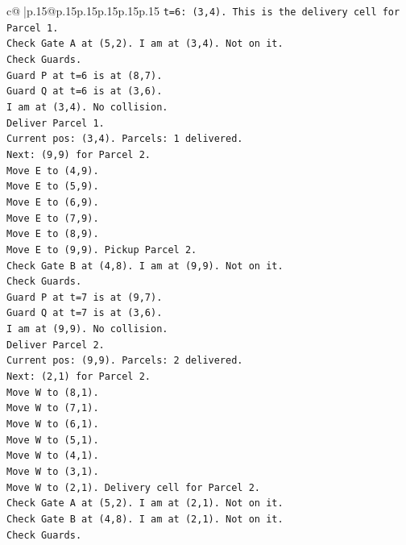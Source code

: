 \documentclass{article}
\begin{document}
{\begin{supertabular}{c@{$\;$}|p{.15\linewidth}@{}p{.15\linewidth}p{.15\linewidth}p{.15\linewidth}p{.15\linewidth}p{.15\linewidth}}
{{{\texttt{t=6: (3,4). This is the delivery cell for Parcel 1.} \\
\texttt{Check Gate A at (5,2). I am at (3,4). Not on it.} \\
\texttt{Check Guards.} \\
\texttt{Guard P at t=6 is at (8,7).} \\
\texttt{Guard Q at t=6 is at (3,6).} \\
\texttt{I am at (3,4). No collision.} \\
\texttt{Deliver Parcel 1.} \\
\texttt{Current pos: (3,4). Parcels: 1 delivered.} \\
\texttt{Next: (9,9) for Parcel 2.} \\
\texttt{Move E to (4,9).} \\
\texttt{Move E to (5,9).} \\
\texttt{Move E to (6,9).} \\
\texttt{Move E to (7,9).} \\
\texttt{Move E to (8,9).} \\
\texttt{Move E to (9,9). Pickup Parcel 2.} \\
\texttt{Check Gate B at (4,8). I am at (9,9). Not on it.} \\
\texttt{Check Guards.} \\
\texttt{Guard P at t=7 is at (9,7).} \\
\texttt{Guard Q at t=7 is at (3,6).} \\
\texttt{I am at (9,9). No collision.} \\
\texttt{Deliver Parcel 2.} \\
\texttt{Current pos: (9,9). Parcels: 2 delivered.} \\
\texttt{Next: (2,1) for Parcel 2.} \\
\texttt{Move W to (8,1).} \\
\texttt{Move W to (7,1).} \\
\texttt{Move W to (6,1).} \\
\texttt{Move W to (5,1).} \\
\texttt{Move W to (4,1).} \\
\texttt{Move W to (3,1).} \\
\texttt{Move W to (2,1). Delivery cell for Parcel 2.} \\
\texttt{Check Gate A at (5,2). I am at (2,1). Not on it.} \\
\texttt{Check Gate B at (4,8). I am at (2,1). Not on it.} \\
\texttt{Check Guards.} \\
}}}
\end{supertabular}}
\end{document}

